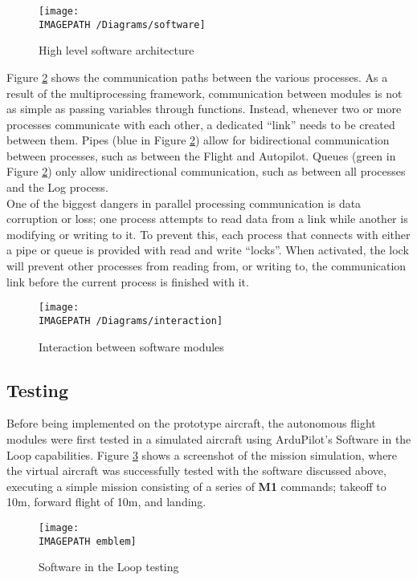 \begin{figure}[!ht]
	\centering
	\texttt{[image: \\IMAGEPATH /Diagrams/software]}
	\caption{High level software architecture}
	\label{fig:softwarearchitecture}
\end{figure}

Figure \ref{fig:softwareinteraction} shows the communication paths between the various processes. As a result of the multiprocessing framework, communication between modules is not as simple as passing variables through functions. Instead, whenever two or more processes communicate with each other, a dedicated ``link'' needs to be created between them. Pipes (blue in Figure \ref{fig:softwareinteraction}) allow for bidirectional communication between processes, such as between the Flight and Autopilot. Queues (green in Figure \ref{fig:softwareinteraction}) only allow unidirectional communication, such as between all processes and the Log process.\\

One of the biggest dangers in parallel processing communication is data corruption or loss; one process attempts to read data from a link while another is modifying or writing to it. To prevent this, each process that connects with either a pipe or queue is provided with read and write ``locks''. When activated, the lock will prevent other processes from reading from, or writing to, the communication link before the current process is finished with it.

\begin{figure}[!ht]
	\centering
	\texttt{[image: \\IMAGEPATH /Diagrams/interaction]}
	\caption{Interaction between software modules}
	\label{fig:softwareinteraction}
\end{figure}

\subsection{Testing}
Before being implemented on the prototype aircraft, the autonomous flight modules were first tested in a simulated aircraft using ArduPilot's Software in the Loop capabilities\cite{ref:sitl}. Figure \ref{fig:sitl} shows a screenshot of the mission simulation, where the virtual aircraft was successfully tested with the software discussed above, executing a simple mission consisting of a series of \textbf{M1} commands; takeoff to 10m, forward flight of 10m, and landing.

\begin{figure}[!ht]
	\centering
	\texttt{[image: \\IMAGEPATH emblem]}
	\caption{Software in the Loop testing}
	\label{fig:sitl}
\end{figure}